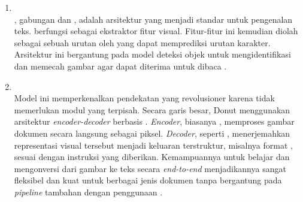 \begin{enumerate}
    \item \crnn ~\\ 
    \crnn, gabungan \cnn{} dan \rnn, adalah arsitektur \dl{} yang menjadi standar untuk pengenalan teks. \cnn{} berfungsi sebagai ekstraktor fitur visual. Fitur-fitur ini kemudian diolah sebagai sebuah urutan oleh \rnn yang dapat memprediksi urutan karakter. Arsitektur ini bergantung pada model deteksi objek untuk mengidentifikasi dan memecah gambar agar dapat diterima \crnn{} untuk dibaca \parencite{shi2016end}. 
    \item \donut{} ~\\ 
    Model ini memperkenalkan pendekatan yang revolusioner karena tidak memerlukan modul \ocr{} yang terpisah. Secara garis besar, Donut menggunakan arsitektur \textit{encoder-decoder} berbasis \transformer. \textit{Encoder}, biasanya \swin, memproses gambar dokumen secara langsung sebagai piksel. \textit{Decoder}, seperti \bart, menerjemahkan representasi visual tersebut menjadi keluaran terstruktur, misalnya format \json, sesuai dengan instruksi yang diberikan. Kemampuannya untuk belajar dan mengonversi dari gambar ke teks secara \textit{end-to-end} menjadikannya sangat fleksibel dan kuat untuk berbagai jenis dokumen tanpa bergantung pada \emph{pipeline} tambahan dengan penggunaan \ocr{} \parencite{kim2021donut}.
\end{enumerate}

